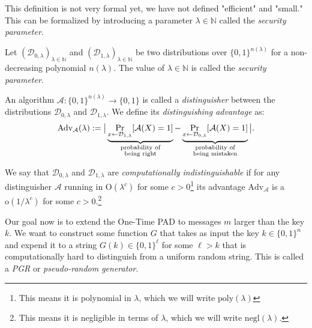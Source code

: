 \documentclass[./main]{subfiles}
\begin{document}
  This definition is not very formal yet, we have not defined "efficient" and "small."
  This can be formalized by introducing a parameter $\lambda \in \mathds{N}$ called the \textit{security parameter}.

  \begin{defn}
    Let $(\mathcal{D}_{0, \lambda})_{\lambda \in \mathds{N}}$ and $(\mathcal{D}_{1, \lambda})_{\lambda \in \mathds{N}}$ be two distributions over $\{0,1\}^{n(\lambda)}$ for a non-decreasing polynomial $n(\lambda)$.
    The value of $\lambda \in \mathds{N}$ is called the \textit{security parameter}.

    An algorithm $\mathcal{A} : \{0,1\}^{n(\lambda)} \to \{0,1\}$ is called a \textit{distinguisher} between the distributions $\mathcal{D}_{0, \lambda}$ and $\mathcal{D}_{1, \lambda}$. We define its \textit{distinguishing advantage} as:
    \[
      \mathrm{Adv}_\mathcal{A}(\lambda) := \big| \underbrace{\Pr_{x \gets \mathcal{D}_{1, \lambda}} [\mathcal{A}(X) = 1]}_{ \mathclap{\substack{\text{probability of}\\ \text{being right}}} } - \underbrace{\Pr_{x \gets \mathcal{D}_{0, \lambda}} [\mathcal{A}(X) = 1]}_{\mathclap{\substack{\text{probability of}\\ \text{being mistaken}}}} \big|
    .\] 

    We say that $\mathcal{D}_{0, \lambda}$ and $\mathcal{D}_{1, \lambda}$ are \textit{computationally indistinguishable} if for any distinguisher $\mathcal{A}$ running in $\mathrm{O}(\lambda^c)$ for some $c > 0$\footnote{This means it is polynomial in $\lambda$, which we will write $\mathrm{poly}(\lambda)$} its advantage $\mathrm{Adv}_\mathcal{A}$ is a $\mathrm{o}(1 / \lambda^c)$ for some $c > 0$.\footnote{This means it is negligible in terms of $\lambda$, which we will write $\mathrm{negl}(\lambda)$.}
  \end{defn}
  
  Our goal now is to extend the One-Time PAD to messages $m$ larger than the key $k$.
  We want to construct some function $G$ that takes as input the key $k \in \{0,1\}^n$ and expend it to a string $G(k) \in \{0,1\}^\ell$  for some $\ell > k$ that is computationally hard to distinguish from a uniform random string.
  This is called a \textit{PGR} or \textit{pseudo-random generator}.
\end{document}
